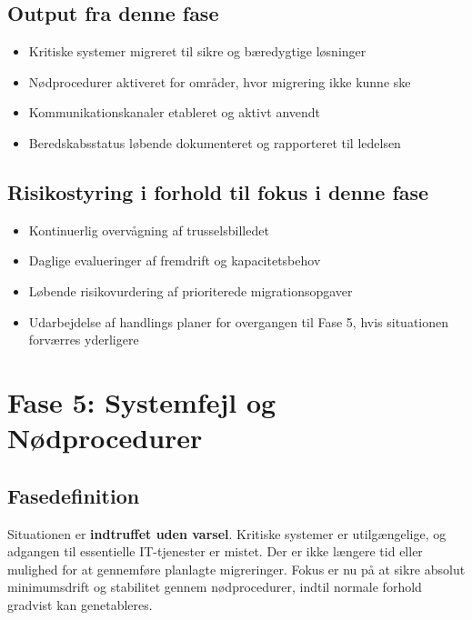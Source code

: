 \documentclass[a4paper,11pt,oneside]{book}
\def\tightlist{}
\begin{document}
\section{Output fra denne fase}\label{output-fra-denne-fase}

\begin{itemize}
\tightlist
\item
  Kritiske systemer migreret til sikre og bæredygtige løsninger
\item
  Nødprocedurer aktiveret for områder, hvor migrering ikke kunne ske
\item
  Kommunikationskanaler etableret og aktivt anvendt
\item
  Beredskabsstatus løbende dokumenteret og rapporteret til ledelsen
\end{itemize}

\section{Risikostyring i forhold til fokus i denne
fase}\label{risikostyring-i-forhold-til-fokus-i-denne-fase}

\begin{itemize}
\tightlist
\item
  Kontinuerlig overvågning af trusselsbilledet
\item
  Daglige evalueringer af fremdrift og kapacitetsbehov
\item
  Løbende risikovurdering af prioriterede migrationsopgaver
\item
  Udarbejdelse af handlings planer for overgangen til Fase 5, hvis
  situationen forværres yderligere
\end{itemize}

\newpage

\chapter{Fase 5: Systemfejl og
Nødprocedurer}\label{fase-5-systemfejl-og-nuxf8dprocedurer}

\section{Fasedefinition}\label{fasedefinition}

Situationen er \textbf{indtruffet uden varsel}. Kritiske systemer er
utilgængelige, og adgangen til essentielle IT-tjenester er mistet. Der
er ikke længere tid eller mulighed for at gennemføre planlagte
migreringer. Fokus er nu på at sikre absolut minimumsdrift og stabilitet
gennem nødprocedurer, indtil normale forhold gradvist kan genetableres.
\end{document}

